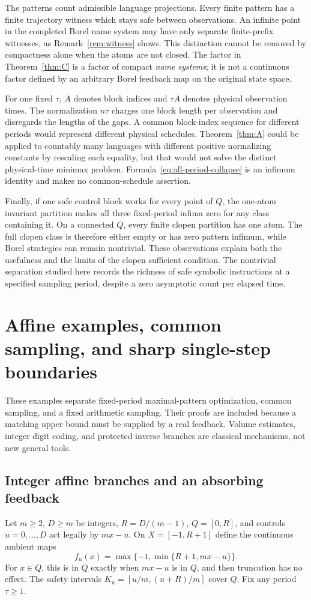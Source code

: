 \documentclass[11pt,reqno]{amsart}
\numberwithin{equation}{section}
\theoremstyle{definition}
\begin{document}
The patterns count admissible language projections. Every finite pattern
has a finite trajectory witness which stays safe between observations.
An infinite point in the completed Borel name system may have only
separate finite-prefix witnesses, as Remark~\ref{rem:witness} shows.
This distinction cannot be removed by compactness alone when the atoms
are not closed. The factor in Theorem~\ref{thm:C} is a factor of compact
\emph{name systems}; it is not a continuous factor defined by an arbitrary
Borel feedback map on the original state space.

For one fixed $\tau$, $A$ denotes block indices and $\tau A$ denotes
physical observation times. The normalization $n\tau$ charges one block
length per observation and disregards the lengths of the gaps. A common
block-index sequence for different periods would represent different
physical schedules. Theorem~\ref{thm:A} could be applied to countably many
languages with different positive normalizing constants by rescaling
each equality, but that would not solve the distinct physical-time
minimax problem. Formula~\eqref{eq:all-period-collapse} is an infimum
identity and makes no common-schedule assertion.

Finally, if one safe control block works for every point of $Q$, the
one-atom invariant partition makes all three fixed-period infima zero
for any class containing it. On a connected $Q$, every finite clopen
partition has one atom. The full clopen class is therefore either empty
or has zero pattern infimum, while Borel strategies can remain
nontrivial. These observations explain both the usefulness and the
limits of the clopen sufficient condition. The nontrivial separation
studied here records the richness of safe symbolic instructions at a
specified sampling period, despite a zero asymptotic count per elapsed
time.


\section{Affine examples, common sampling, and sharp single-step boundaries}
\label{sec:affine}

These examples separate fixed-period maximal-pattern optimization,
common sampling, and a fixed arithmetic sampling. Their proofs are
included because a matching upper bound must be supplied by a real
feedback. Volume estimates, integer digit coding, and protected inverse
branches are classical mechanisms, not new general tools.

\subsection{Integer affine branches and an absorbing feedback}
Let $m\ge2$, $D\ge m$ be integers, $R=D/(m-1)$,
$Q=[0,R]$, and controls $u=0,\ldots,D$ act legally by $mx-u$.
On $X=[-1,R+1]$ define the continuous ambient maps
\[
 f_u(x)=\max\{-1,\min\{R+1,mx-u\}\}.
\]
For $x\in Q$, this is in $Q$ exactly when $mx-u$ is in $Q$,
and then truncation has no effect. The safety intervals
$K_u=[u/m,(u+R)/m]$ cover $Q$. Fix any period $\tau\ge1$.
\end{document}
